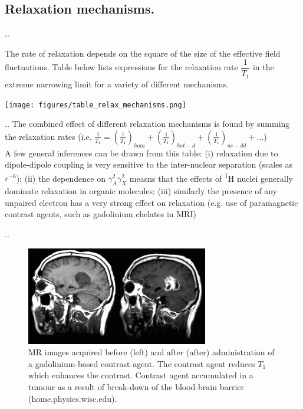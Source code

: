 \documentclass{beamer}
\begin{document}
\subsection{Relaxation mechanisms.}
\begin{frame}{\thesection.\thesubsection. \insertsubsection}
	\begin{minipage}{0.4\textwidth}
		The rate of relaxation depends on the square of the size of the effective field fluctuations. Table below lists expressions for the relaxation rate $\dfrac{1}{T_1}$ in the extreme narrowing limit for a variety of different mechanisms.
	\end{minipage}
	\hspace{0.1cm}
    \begin{minipage}{0.55\textwidth}
	 		\centering
	 		\texttt{[image: figures/table\_relax\_mechanisms.png]}	 		
    \end{minipage}

\end{frame}

\begin{frame}{\thesection.\thesubsection. \insertsubsection}
   The combined effect of different relaxation mechanisms is found by summing the relaxation rates (i.e. $\frac{1}{T_1} = (\frac{1}{T_1})_{hom} + (\frac{1}{T_1})_{het-d} + (\frac{1}{T_1})_{ue-dd} + ...$)\\
   A few general inferences can be drawn from this table: (i) relaxation due to dipole-dipole coupling is very sensitive to the inter-nuclear separation (scales as $r^{-6}$); (ii) the dependence on $\gamma_A^2 \gamma_X^2$ measns that the effects of \textsuperscript{1}H nuclei generally dominate relaxation in organic molecules; (iii) similarly the presence of any unpaired electron has a very strong effect on relaxation (e.g. use of paramagnetic contrast agents, such as gadolinium chelates in MRI)
\end{frame}

\begin{frame}{\thesection.\thesubsection. \insertsubsection}
   \begin{figure}
   	  \centering
   	  \includegraphics[scale=0.9]{figures/contrast_MRI_Gd.png}
   	  \caption{MR images acquired before (left) and
   	  	after (after) administration of a gadolinium-based
   	  	contrast agent. The contrast agent
   	  	reduces $T_1$ which enhances the contrast.
   	  	Contrast agent accumulated in a tumour as a
   	  	result of break-down of the blood-brain
   	  	barrier (home.physics.wisc.edu).}
   \end{figure}
\end{frame}
\end{document}
